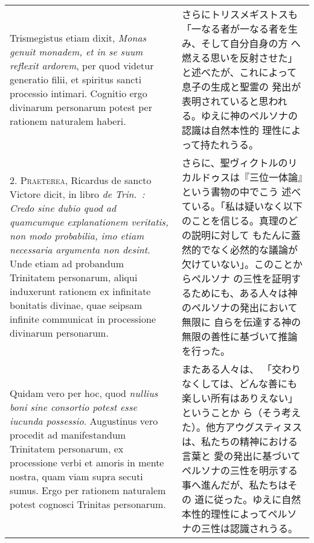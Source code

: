 \documentclass[10pt]{jsarticle} %
\begin{document}
\begin{longtable}{p{21em}p{21em}}
\\

Trismegistus etiam dixit, {\itshape Monas genuit
monadem, et in se suum reflexit ardorem}, per quod videtur generatio
filii, et spiritus sancti processio intimari. Cognitio ergo divinarum
personarum potest per rationem naturalem haberi.

&

さらにトリスメギストスも「一なる者が一なる者を生み、そして自分自身の方
 へ燃える思いを反射させた」と述べたが、これによって息子の生成と聖霊の
 発出が表明されていると思われる。ゆえに神のペルソナの認識は自然本性的
 理性によって持たれうる。

\\



2. {\scshape Praeterea}, Ricardus de sancto Victore dicit, in libro
 {\itshape de Trin.~: Credo
sine dubio quod ad quamcumque explanationem veritatis, non modo
probabilia, imo etiam necessaria argumenta non desint}. Unde etiam ad
probandum Trinitatem personarum, aliqui induxerunt rationem ex
infinitate bonitatis divinae, quae seipsam infinite communicat in
processione divinarum personarum. 


&

さらに、聖ヴィクトルのリカルドゥスは『三位一体論』という書物の中でこう
 述べている。「私は疑いなく以下のことを信じる。真理のどの説明に対して
 もたんに蓋然的でなく必然的な議論が欠けていない」。このことからペルソナ
 の三性を証明するためにも、ある人々は神のペルソナの発出において無限に
 自らを伝達する神の無限の善性に基づいて推論を行った。

\\


Quidam vero per hoc, quod {\itshape nullius
boni sine consortio potest esse iucunda possessio}. Augustinus vero
procedit ad manifestandum Trinitatem personarum, ex processione verbi
et amoris in mente nostra, quam viam supra secuti sumus. Ergo per
rationem naturalem potest cognosci Trinitas personarum.


&


またある人々は、
 「交わりなくしては、どんな善にも楽しい所有はありえない」ということか
 ら（そう考えた）。他方アウグスティヌスは、私たちの精神における言葉と
 愛の発出に基づいてペルソナの三性を明示する事へ進んだが、私たちはその
 道に従った。ゆえに自然本性的理性によってペルソナの三性は認識されうる。


\\




\end{longtable}
\end{document}
